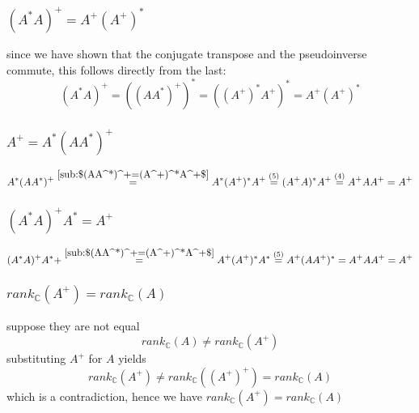 \documentclass[a4paper,10pt]{article}
\begin{document}
\subsubsection{$(A^*A)^+=A^+(A^+)^* $}
\label{sub: $(A^*A)^+=A^+(A^+)^* $}
since we have shown that the conjugate transpose and the pseudoinverse commute, this follows directly from the last:
\begin{equation}
	(A^*A)^+=\left( (AA^*)^+ \right)^*=\left((A^+)^*A^+  \right)^*=A^+(A^+)^*
\end{equation}
\subsubsection{$A^+=A^*(AA^*)^+$}
\label{sub:$A^+=A^*(AA^*)^+$}
\begin{equation}
	A^*(AA^*)^+\stackrel{\ref{sub:$(AA^*)^+=(A^+)^*A^+$}}{=} A^*(A^+)^*A^+\stackrel{(5)}{=}(A^+A)^*A^+ \stackrel{(4)}{=}
	A^+AA^+=A^+
\end{equation}
\subsubsection{$(A^*A)^+A^*=A^+$}
\label{ssub:$(A^*A)^+A^*=A^+$}
\begin{equation}
	(A^*A)^+A^*+\stackrel{\ref{sub:$(AA^*)^+=(A^+)^*A^+$}}{=}A^+(A^+)^*A^*\stackrel{(5)}{=} A^+(AA^+)^*=A^+AA^+=A^+
\end{equation}
\subsubsection{$rank_\mathbb{C}(A^+)=rank_\mathbb{C}(A)$}
\label{ssub:rank}
suppose they are not equal
\begin{equation}
	rank_\mathbb{C}(A) \neq rank_\mathbb{C}(A^+)
\end{equation}
substituting $A^+$ for $A$ yields
\begin{equation}
	rank_\mathbb{C}(A^+)\neq rank_\mathbb{C}\left( (A^+)^+ \right)=rank_\mathbb{C}(A)
\end{equation}
which is a contradiction, hence we have $rank_\mathbb{C}(A^+)=rank_\mathbb{C}(A)$
\end{document}
